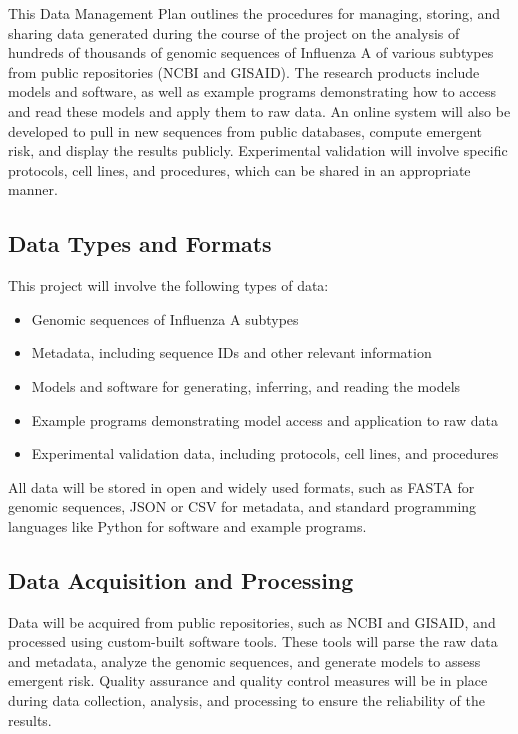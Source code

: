 \documentclass[onecolumn, compsoc,12pt]{IEEEtran}
\begin{document}
This Data Management Plan outlines the procedures for managing, storing, and sharing data generated during the course of the project on the analysis of hundreds of thousands of genomic sequences of Influenza A of various subtypes from public repositories (NCBI and GISAID). The research products include models and software, as well as example programs demonstrating how to access and read these models and apply them to raw data. An online system will also be developed to pull in new sequences from public databases, compute emergent risk, and display the results publicly. Experimental validation will involve specific protocols, cell lines, and procedures, which can be shared in an appropriate manner.

\subsection{Data Types and Formats}

This project will involve the following types of data:

\begin{itemize}
  \item Genomic sequences of Influenza A subtypes
  \item Metadata, including sequence IDs and other relevant information
  \item Models and software for generating, inferring, and reading the models
  \item Example programs demonstrating model access and application to raw data
  \item Experimental validation data, including protocols, cell lines, and procedures
\end{itemize}

All data will be stored in open and widely used formats, such as FASTA for genomic sequences, JSON or CSV for metadata, and standard programming languages like Python for software and example programs.

\subsection{Data Acquisition and Processing}

Data will be acquired from public repositories, such as NCBI and GISAID, and processed using custom-built software tools. These tools will parse the raw data and metadata, analyze the genomic sequences, and generate models to assess emergent risk. Quality assurance and quality control measures will be in place during data collection, analysis, and processing to ensure the reliability of the results.
\end{document}
